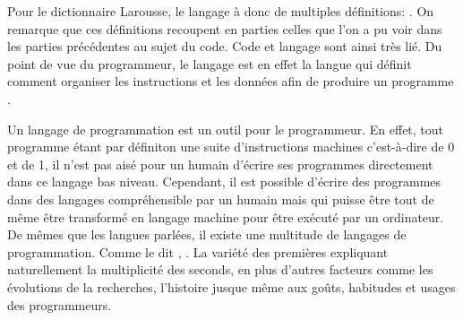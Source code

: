 \documentclass[12pt]{article} %
\begin{document}
Pour le dictionnaire Larousse, le langage à donc de multiples définitions:
\cite{Nimmo2017-ya}. On remarque que ces définitions recoupent en parties celles que l'on a pu voir dans les parties précédentes au sujet du code. Code et langage sont ainsi très lié. Du point de vue du programmeur, le langage est en effet la langue qui définit comment organiser les instructions et les données afin de produire un programme \cite{BernardAmade2019}.

Un langage de programmation est un outil pour le programmeur. En effet, tout programme étant par définiton une suite d'instructions machines c'est-à-dire de 0 et de 1, il n'est pas aisé pour un humain d'écrire ses programmes directement dans ce langage bas niveau. Cependant, il est possible d'écrire des programmes dans des langages compréhensible par un humain mais qui puisse être tout de même être transformé en langage machine pour être exécuté par un ordinateur. De mêmes que les langues parlées, il existe une multitude de langages de programmation. Comme le dit \citeauthor{BernardAmade2019},  \cite{BernardAmade2019}. La variété des premières expliquant naturellement la multiplicité des seconds, en plus d'autres facteurs comme les évolutions de la recherches, l'histoire jusque même aux goûts, habitudes et usages des programmeurs.
\end{document}
